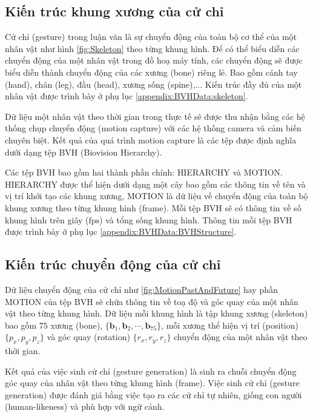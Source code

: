 \subsection{Kiến trúc khung xương của cử chỉ}

Cử chỉ (gesture) trong luận văn là sự chuyển động của toàn bộ cơ thể của một nhân vật như hình \autoref{fig:Skeleton} theo từng khung hình. Để có thể biểu diễn các chuyển động của một nhân vật trong đồ hoạ máy tính, các chuyển động sẽ được biểu diễn thành chuyển động của các xương (bone) riêng lẻ. Bao gồm cánh tay (hand), chân (leg), đầu (head), xương sống (spine),... Kiến trúc đầy đủ của một nhân vật được trình bày ở phụ lục \autoref{appendix:BVHData:skeleton}.

Dữ liệu một nhân vật theo thời gian trong thực tế sẽ được thu nhận bằng các hệ thống chụp chuyển động (motion capture) với các hệ thống camera và cảm biến chuyên biệt. Kết quả của quá trình motion capture là các tệp được định nghĩa dưới dạng tệp BVH (Biovision Hierarchy).

Các tệp BVH bao gồm hai thành phần chính: {HIERARCHY} và {MOTION}. HIERARCHY được thể hiện dưới dạng một cây bao gồm các thông tin về tên và vị trí khởi tạo các khung xương, MOTION là dữ liệu về chuyển động của toàn bộ khung xương theo từng khung hình (frame).  Mỗi tệp BVH sẽ có thông tin về số khung hình trên giây ($\text{fps}$) và tổng sống khung hình. Thông tin mỗi tệp BVH được trình bày ở phụ lục \autoref{appendix:BVHData:BVHStructure}. 


\subsection{Kiến trúc chuyển động của cử chỉ}

Dữ liệu chuyển động của cử chỉ như \autoref{fig:MotionPastAndFuture} hay phần MOTION của tệp BVH sẽ chứa thông tin về toạ độ và góc quay của một nhân vật theo từng khung hình. Dữ liệu mỗi khung hình là tập khung xương (skeleton) bao gồm $75$ xương (bone), $\{ \textbf{b}_{1}, \textbf{b}_{2}, \cdots , \textbf{b}_{75} \}$, mỗi xương thể hiện vị trí (position) $\{ p_{x}, p_{y}, p_{z} \}$ và góc quay (rotation) $\{ r_{x}, r_{y}, r_{z} \}$ chuyển động của một nhân vật theo thời gian.

Kết quả của việc sinh cử chỉ (gesture generation) là sinh ra chuỗi chuyển động góc quay của nhân vật theo từng khung hình (frame). Việc sinh cử chỉ (gesture generation) được đánh giá bằng việc tạo ra các cử chỉ tự nhiên, giống con người (human-likeness) và phù hợp với ngữ cảnh.

